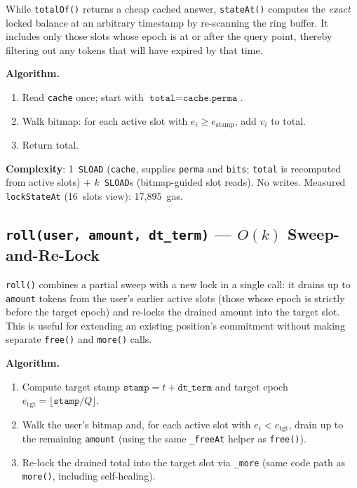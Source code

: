\documentclass[10pt,a4paper,twocolumn]{article}
\begin{document}
While \texttt{totalOf()} returns a cheap cached answer, \texttt{stateAt()} computes the \emph{exact} locked balance at an arbitrary timestamp by re-scanning the ring buffer.  It includes only those slots whose epoch is at or after the query point, thereby filtering out any tokens that will have expired by that time.

\textbf{Algorithm.}
\begin{enumerate}[leftmargin=*, nosep]
\item Read \texttt{cache} once; start with $\texttt{total} = \texttt{cache.perma}$.
\item Walk bitmap: for each active slot with $e_i \geq e_{\text{stamp}}$, add $v_i$ to total.
\item Return total.
\end{enumerate}

\textbf{Complexity}: 1~\texttt{SLOAD} (\texttt{cache}, supplies \texttt{perma} and \texttt{bits}; \texttt{total} is recomputed from active slots) + $k$~\texttt{SLOAD}s (bitmap-guided slot reads). No writes. Measured \texttt{lockStateAt} (16~slots view): 17{,}895~gas.

\subsection{\texttt{roll(user, amount, dt\_term)} --- $O(k)$ Sweep-and-Re-Lock}
\label{subsec:roll}

\texttt{roll()} combines a partial sweep with a new lock in a single call: it drains up to \texttt{amount} tokens from the user's earlier active slots (those whose epoch is strictly before the target epoch) and re-locks the drained amount into the target slot. This is useful for extending an existing position's commitment without making separate \texttt{free()} and \texttt{more()} calls.

\textbf{Algorithm.}
\begin{enumerate}[leftmargin=*, nosep]
\item Compute target stamp $\texttt{stamp} = t + \texttt{dt\_term}$ and target epoch $e_{\text{tgt}} = \lfloor \texttt{stamp}/Q \rfloor$.
\item Walk the user's bitmap and, for each active slot with $e_i < e_{\text{tgt}}$, drain up to the remaining \texttt{amount} (using the same \texttt{\_freeAt} helper as \texttt{free()}).
\item Re-lock the drained total into the target slot via \texttt{\_more} (same code path as \texttt{more()}, including self-healing).
\end{enumerate}
\end{document}
